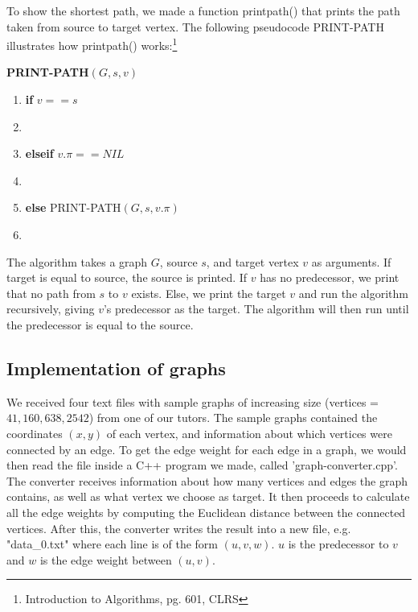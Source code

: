 \documentclass[11pt]{article}
\begin{document}
\noindent To show the shortest path, we made a function print\textunderscore path() that prints the path taken from source to target vertex. The following pseudocode PRINT-PATH illustrates how print\textunderscore path() works:\footnote{Introduction to Algorithms, pg. 601, CLRS}

\newpage
\noindent \textbf{PRINT-PATH$(G, s, v)$}
\begin{enumerate}
\setlength\itemsep{0em}
\item \textbf{if }$v == s$
\item {}
\item \textbf{elseif }$v.\pi == NIL$
\item {}
\item \textbf{else } PRINT-PATH$(G, s, v.\pi)$
\item {}
\end{enumerate}

\noindent The algorithm takes a graph $G$, source $s$, and target vertex $v$ as arguments. If target is equal to source, the source is printed. If $v$ has no predecessor, we print that no path from $s$ to $v$ exists. Else, we print the target $v$ and run the algorithm recursively, giving $v$'s predecessor as the target. The algorithm will then run until the predecessor is equal to the source.\\

\subsection{Implementation of graphs}
\noindent We received four text files with sample graphs of increasing size (vertices = $41, 160, 638, 2542$) from one of our tutors. The sample graphs contained the coordinates $(x,y)$ of each vertex, and information about which vertices were connected by an edge. To get the edge weight for each edge in a graph, we would then read the file inside a C++ program we made, called 'graph-converter.cpp'.\\ 

\noindent The converter receives information about how many vertices and edges the graph contains, as well as what vertex we choose as target. It then proceeds to calculate all the edge weights by computing the Euclidean distance between the connected vertices. After this, the converter writes the result into a new file, e.g. "data{\_}0.txt" where each line is of the form $(u, v, w)$. $u$ is the predecessor to $v$ and $w$ is the edge weight between $(u,v)$.\\
\end{document}
